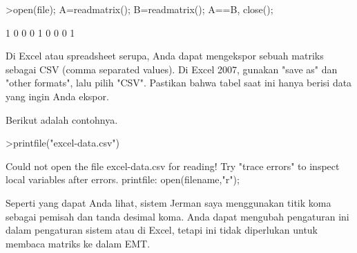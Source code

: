 \documentclass[12pt,arial,letterpaper]{book}
\begin{document}
\begin{eulercomment}
\begin{eulercomment}
\begin{eulercomment}
\begin{eulercomment}
\begin{eulercomment}
\begin{eulercomment}
\begin{eulercomment}
\begin{eulercomment}
\begin{eulercomment}
\begin{eulercomment}
\begin{eulercomment}
\begin{eulercomment}
\begin{eulercomment}
\begin{eulercomment}
\begin{eulercomment}
\begin{eulercomment}
\begin{eulercomment}
\begin{eulercomment}
\begin{eulercomment}
\begin{eulercomment}
\begin{eulercomment}
\begin{eulercomment}
\begin{eulercomment}
\begin{eulercomment}
\begin{eulercomment}
\begin{eulercomment}
\begin{eulercomment}
\begin{eulercomment}
\begin{eulercomment}
\begin{eulercomment}
\begin{eulercomment}
\begin{eulercomment}
\begin{eulercomment}
\begin{eulercomment}
\begin{eulercomment}
\begin{eulercomment}
\begin{eulercomment}
\begin{eulercomment}
\begin{eulerprompt}
>open(file); A=readmatrix(); B=readmatrix(); A==B, close();
\end{eulerprompt}
\begin{euleroutput}
          1         0         0 
          0         1         0 
          0         0         1 
\end{euleroutput}
\begin{eulercomment}
Di Excel atau spreadsheet serupa, Anda dapat mengekspor sebuah matriks
sebagai CSV (comma separated values). Di Excel 2007, gunakan "save as"
dan "other formats", lalu pilih "CSV". Pastikan bahwa tabel saat ini
hanya berisi data yang ingin Anda ekspor.

Berikut adalah contohnya.
\end{eulercomment}
\begin{eulerprompt}
>printfile("excel-data.csv")
\end{eulerprompt}
\begin{euleroutput}
  Could not open the file
  excel-data.csv
  for reading!
  Try "trace errors" to inspect local variables after errors.
  printfile:
      open(filename,"r");
\end{euleroutput}
\begin{eulercomment}
Seperti yang dapat Anda lihat, sistem Jerman saya menggunakan titik
koma sebagai pemisah dan tanda desimal koma. Anda dapat mengubah
pengaturan ini dalam pengaturan sistem atau di Excel, tetapi ini tidak
diperlukan untuk membaca matriks ke dalam EMT.


\end{eulercomment}
\end{eulercomment}
\end{eulercomment}
\end{eulercomment}
\end{eulercomment}
\end{eulercomment}
\end{eulercomment}
\end{eulercomment}
\end{eulercomment}
\end{eulercomment}
\end{eulercomment}
\end{eulercomment}
\end{eulercomment}
\end{eulercomment}
\end{eulercomment}
\end{eulercomment}
\end{eulercomment}
\end{eulercomment}
\end{eulercomment}
\end{eulercomment}
\end{eulercomment}
\end{eulercomment}
\end{eulercomment}
\end{eulercomment}
\end{eulercomment}
\end{eulercomment}
\end{eulercomment}
\end{eulercomment}
\end{eulercomment}
\end{eulercomment}
\end{eulercomment}
\end{eulercomment}
\end{eulercomment}
\end{eulercomment}
\end{eulercomment}
\end{eulercomment}
\end{eulercomment}
\end{eulercomment}
\end{eulercomment}
\end{document}
